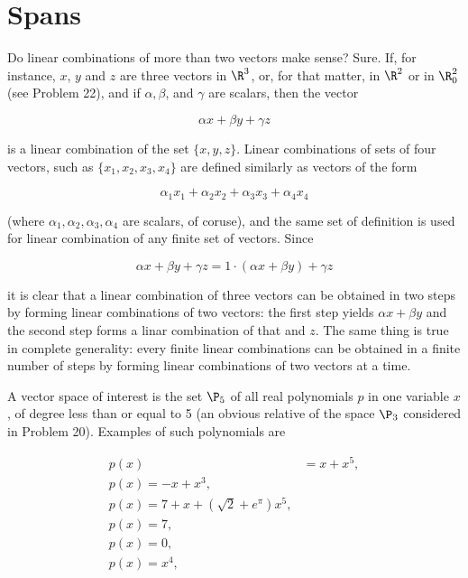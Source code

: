 \section{Spans}

Do linear combinations of more than two vectors make sense? Sure. If, for instance, $x$, $y$ and $z$ are three vectors in $\R^3$, or, for that matter, in $\R^2$ or in $\R^2_0$ (see Problem 22), and if $\alpha, \beta$, and $\gamma$ are scalars, then the vector

\begin{equation}
    \alpha x + \beta y + \gamma z
\end{equation}

is a linear combination of the set $\{x,y,z\}$. Linear combinations of sets of four vectors, such as $\{x_1, x_2, x_3, x_4\}$ are defined similarly as vectors of the form

\begin{equation}
    \alpha_1 x_1 + \alpha_2 x_2 + \alpha_3 x_3 + \alpha_4 x_4
\end{equation}

(where $\alpha_1, \alpha_2, \alpha_3, \alpha_4$ are scalars, of coruse), and the same set of definition is used for linear combination of any finite set of vectors. Since

\begin{equation}
    \alpha x + \beta y + \gamma z = 1 \cdot (\alpha x + \beta y) + \gamma z
\end{equation}

it is clear that a linear combination of three vectors can be obtained in two steps by forming linear combinations of two vectors: the first step yields $\alpha x + \beta y$ and the second step forms a linar combination of that and $z$. The same thing is true in complete generality: every finite linear combinations can be obtained in a finite number of steps by forming linear combinations of two vectors at a time.

A vector space of interest is the set $\P_5$ of all real polynomials $p$ in one variable $x$, of degree less than or equal to 5 (an obvious relative of the space $\P_3$ considered in Problem 20). Examples of such polynomials are

\begin{align}
    p(x) & = x + x^5,                      \\
    p(x) = -x + x^3,                       \\
    p(x) = 7 + x + (\sqrt{2} + e^\pi) x^5, \\
    p(x) = 7,                              \\
    p(x) = 0,                              \\
    p(x) = x^4,                            \\
\end{align}

